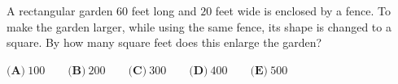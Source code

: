 A rectangular garden $60$ feet long and $20$ feet wide is enclosed by a fence. To make the garden larger, while using the same fence, its shape is changed to a square. By how many square feet does this enlarge the garden?

$\textbf{(A)}\ 100\qquad\textbf{(B)}\ 200\qquad\textbf{(C)}\ 300\qquad\textbf{(D)}\ 400\qquad\textbf{(E)}\ 500$
